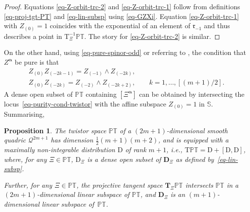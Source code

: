 \documentclass[10pt,a4paper]{amsart}
\numberwithin{equation}{section}
\newtheorem{Proposition}[Theorem]{Proposition}
 { \theoremstyle{definition}
\newtheorem{Definition}[Theorem]{Definition}
\newtheorem{Example}[Theorem]{Example}
\newtheorem{Remark}[Theorem]{Remark} }
\newcommand{\mbf} [1]{\mathbf{#1}}
\newcommand{\mc} [1]{\mathcal{#1}}
\newcommand{\Tgt} {\mathrm{T}}
\newcommand{\mfr} {\mathfrak{r}}
\newcommand{\PT} {\mathbb{PT}}
\newcommand{\Ss} {\mathbb{S}}
\begin{document}
\begin{proof}
Equations \eqref{eq-Z-orbit-trc-2} and \eqref{eq-Z-orbit-trc-1} follow from def\/initions \eqref{eq-proj-tgt-PT} and \eqref{eq-lin-subsp} using \eqref{eq-GZXi}. Equation \eqref{eq-Z-orbit-trc-1} with $Z_{(0)} =1$ coincides with the exponential of an element of $\mfr_{-1}$ and thus describes a point in $\Tgt^{-1}_\Xi \PT$. The story for \eqref{eq-Z-orbit-trc-2} is similar.
\end{proof}

On the other hand, using \eqref{eq-pure-spinor-odd} or referring to \cite{Cartan1981}, the condition that $Z^{\bm{\upalpha}}$ be pure is that
\begin{gather}
Z_{(0)} Z_{(-2k-1)} = Z_{(-1)} \wedge Z_{(-2k)} , \nonumber\\
Z_{(0)} Z_{(-2k)} = Z_{(-2)} \wedge Z_{(-2k+2)} ,\qquad k=1, \ldots , [(m+1)/2] .\label{eq-purity-cond-twistor}
\end{gather}
A dense open subset of $\PT$ containing $[\Xi^{\bm{\upalpha}}]$ can be obtained by intersecting the locus~\eqref{eq-purity-cond-twistor} with the af\/f\/ine subspace $Z_{(0)} =1$ in $\Ss$. Summarising,

\begin{Proposition}\label{prop-canonical-distribution}
The twistor space $\PT$ of a $(2m+1)$-dimensional smooth quadric $\mc{Q}^{2m+1}$ has dimension $\frac{1}{2}(m+1)(m+2)$, and is equipped with a maximally non-integrable distribution $\mathrm{D}$ of rank $m+1$, i.e., $\Tgt \PT = \mathrm{D} + [ \mathrm{D} , \mathrm{D} ]$, where, for any $\Xi \in \PT$, $\mathrm{D}_\Xi$ is a dense open subset of $\mbf{D}_\Xi$ as defined by~\eqref{eq-lin-subsp}.

Further, for any $\Xi \in \PT$, the projective tangent space $\mbf{T}_\Xi \PT$ intersects $\PT$ in a $(2m+1)$-dimensional linear subspace of $\PT$, and $\mbf{D}_\Xi$ is an $(m+1)$-dimensional linear subspace of~$\PT$.
\end{Proposition}
\end{document}
